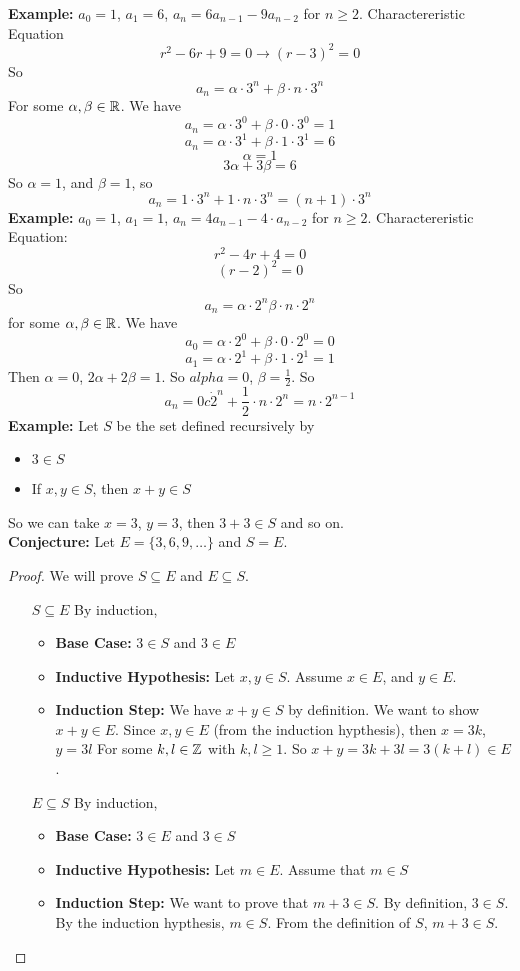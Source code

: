 \documentclass[openany]{report}
\begin{document}
\textbf{Example:} $a_0 = 1$, $a_1 = 6$, $a_n = 6a_{n-1} - 9a_{n-2}$ for $n \geq 2$. Charactereristic Equation
\[r^2 - 6r + 9 = 0 \rightarrow (r-3)^2 = 0\]
So 
\[a_n = \alpha \cdot 3^n + \beta \cdot n \cdot 3^n\]
For some $\alpha, \beta \in \mathbb{R}$. We have 
\[a_n = \alpha \cdot 3^0 + \beta \cdot 0 \cdot 3^0 = 1\]
\[a_n = \alpha \cdot 3^1 + \beta \cdot 1 \cdot 3^1 = 6\]
\[\alpha = 1\]
\[3 \alpha + 3\beta = 6\]
So $\alpha = 1$, and $\beta = 1$, so 
\[a_n = 1\cdot 3^n + 1 \cdot n \cdot 3^n = (n+1)\cdot 3^n\]
\textbf{Example:} $a_0 = 1$, $a_1 = 1$, $a_n = 4a_{n-1} - 4 \cdot a_{n-2}$ for $n \geq 2$. Charactereristic Equation:
\[r^2 - 4r + 4 = 0\]
\[(r-2)^2 = 0\]
So 
\[a_n = \alpha \cdot 2^n \beta \cdot n \cdot 2^n \]
for some $\alpha, \beta \in \mathbb{R}$. We have
\[a_0 = \alpha \cdot 2^0 + \beta \cdot 0 \cdot 2^0 = 0\]
\[a_1 = \alpha \cdot 2^1 + \beta \cdot 1 \cdot 2^1 = 1\]
Then $\alpha = 0$, $2\alpha + 2\beta = 1$. So $alpha = 0$, $\beta = \frac{1}{2}$. So
\[a_n = 0 c\dot 2^n + \frac{1}{2} \cdot n \cdot 2^n = n \cdot 2^{n-1}\]
\textbf{Example:} Let $S$ be the set defined recursively by
\begin{itemize}
    \item $3 \in S$
    \item If $x,y \in S$, then $x + y \in S$
\end{itemize}
So we can take $x = 3$, $y = 3$, then $3 + 3 \in S$ and so on.\\[2ex]
\textbf{Conjecture:} Let $E = \{3,6,9, \ldots\}$ and $S = E$. 
\begin{proof}
    We will prove $S \subseteq E$ and $E \subseteq S$.
\begin{enumerate}
    \item [$S \subseteq E$] By induction,
    \begin{itemize}
        \item \textbf{Base Case:} $3 \in S$ and $3 \in E$
        \item \textbf{Inductive Hypothesis:} Let $x,y \in S$. Assume $x \in E$, and $y \in E$. 
        \item \textbf{Induction Step:} We have $x + y \in S$ by definition. We want to show $x + y \in E$. Since $x, y \in E$ (from the induction hypthesis), then $x = 3k$, $y = 3l$ For some $k,l \in \mathbb{Z}$ with $k,l \geq 1$. So $x + y = 3k + 3l = 3(k+l) \in E$.
    \end{itemize}
    \item [$E \subseteq S$] By induction,
    \begin{itemize}
        \item \textbf{Base Case:} $3 \in E$ and $3 \in S$
        \item \textbf{Inductive Hypothesis:} Let $m \in E$. Assume that $m \in S$
        \item \textbf{Induction Step:} We want to prove that $m + 3 \in S$. By definition, $3 \in S$. By the induction hypthesis, $m \in S$. From the definition of $S$, $m + 3 \in S$. 
    \end{itemize}
\end{enumerate}
\end{proof}
\end{document}
